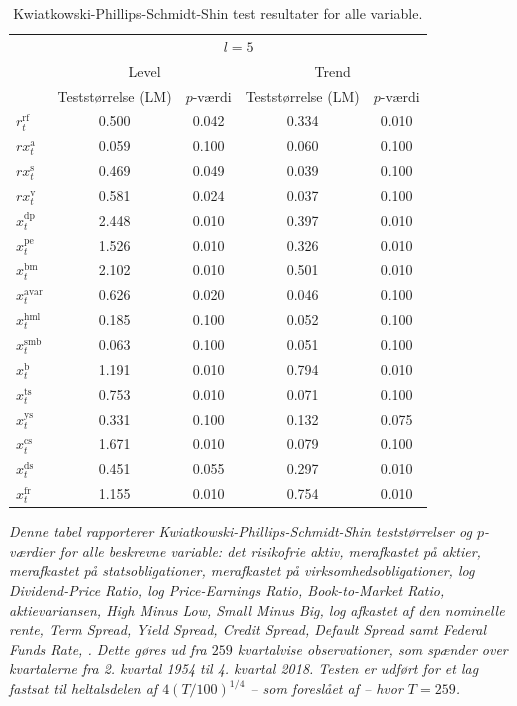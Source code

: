 \documentclass[
  a4paper,
  oneside]{memoir}
\begin{document}
\begin{table}[H]

\caption{\label{tab:STAT-KPSS}Kwiatkowski-Phillips-Schmidt-Shin test resultater for alle variable.}
\centering
\begin{threeparttable}
\begin{tabular}[t]{lcccc}
\toprule
\multicolumn{1}{c}{ } & \multicolumn{4}{c}{$l=5$} \\
\cmidrule(l{3pt}r{3pt}){2-5}
\multicolumn{1}{c}{ } & \multicolumn{2}{c}{Level} & \multicolumn{2}{c}{Trend} \\
\cmidrule(l{3pt}r{3pt}){2-3} \cmidrule(l{3pt}r{3pt}){4-5}
  & Teststørrelse (LM) & $p$-værdi & Teststørrelse (LM) & $p$-værdi\\
\midrule
\rowcolor{gray!6}  $r_t^{\text{rf}}$ & 0.500 & 0.042 & 0.334 & 0.010\\
$rx_t^{\text{a}}$ & 0.059 & 0.100 & 0.060 & 0.100\\
\rowcolor{gray!6}  $rx_t^{\text{s}}$ & 0.469 & 0.049 & 0.039 & 0.100\\
$rx_t^{\text{v}}$ & 0.581 & 0.024 & 0.037 & 0.100\\
\rowcolor{gray!6}  $x_t^{\text{dp}}$ & 2.448 & 0.010 & 0.397 & 0.010\\
$x_t^{\text{pe}}$ & 1.526 & 0.010 & 0.326 & 0.010\\
\rowcolor{gray!6}  $x_t^{\text{bm}}$ & 2.102 & 0.010 & 0.501 & 0.010\\
$x_t^{\text{avar}}$ & 0.626 & 0.020 & 0.046 & 0.100\\
\rowcolor{gray!6}  $x_t^{\text{hml}}$ & 0.185 & 0.100 & 0.052 & 0.100\\
$x_t^{\text{smb}}$ & 0.063 & 0.100 & 0.051 & 0.100\\
\rowcolor{gray!6}  $x_t^{\text{b}}$ & 1.191 & 0.010 & 0.794 & 0.010\\
$x_t^{\text{ts}}$ & 0.753 & 0.010 & 0.071 & 0.100\\
\rowcolor{gray!6}  $x_t^{\text{ys}}$ & 0.331 & 0.100 & 0.132 & 0.075\\
$x_t^{\text{cs}}$ & 1.671 & 0.010 & 0.079 & 0.100\\
\rowcolor{gray!6}  $x_t^{\text{ds}}$ & 0.451 & 0.055 & 0.297 & 0.010\\
$x_t^{\text{fr}}$ & 1.155 & 0.010 & 0.754 & 0.010\\
\bottomrule
\end{tabular}
\begin{tablenotes}
\item \textit{Denne tabel rapporterer Kwiatkowski-Phillips-Schmidt-Shin teststørrelser og $p$-værdier for alle beskrevne variable: det risikofrie aktiv, merafkastet på aktier, merafkastet på statsobligationer, merafkastet på virksomhedsobligationer, log Dividend-Price Ratio, log Price-Earnings Ratio, Book-to-Market Ratio, aktievariansen, High Minus Low, Small Minus Big, log afkastet af den nominelle rente, Term Spread, Yield Spread, Credit Spread, Default Spread samt Federal Funds Rate, \citep{Kwiatkowski1992}. Dette gøres ud fra $259$ kvartalvise observationer, som spænder over kvartalerne fra 2. kvartal 1954 til 4. kvartal 2018. Testen er udført for et lag fastsat til heltalsdelen af $4(T/100)^{1/4}$ -- som foreslået af \citep{Schwert1989} -- hvor $T=259$.}

\end{tablenotes}
\end{threeparttable}
\end{table}
\end{document}
